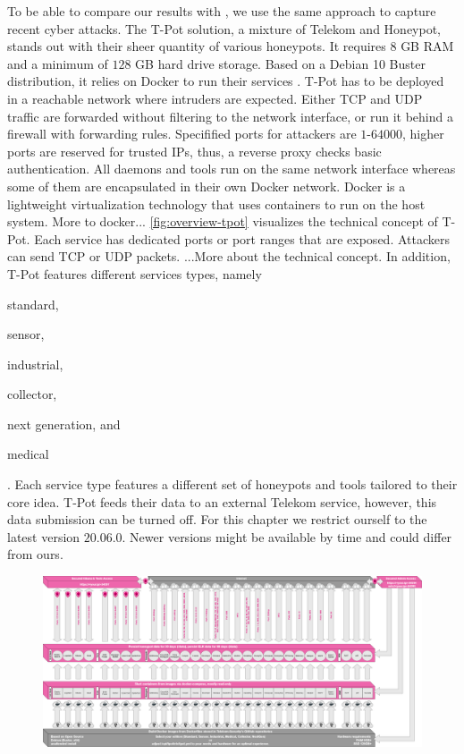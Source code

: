 To be able to compare our results with \citet{Kelly2021}, we use the same approach to capture recent cyber attacks.
The T-Pot solution, a mixture of Telekom and Honeypot, stands out with their sheer quantity of various honeypots.
It requires $8$ GB RAM and a minimum of $128$ GB hard drive storage.
Based on a Debian 10 Buster distribution, it relies on Docker to run their services \cite{combe2016}.
T-Pot has to be deployed in a reachable network where intruders are expected.
Either TCP and UDP traffic are forwarded without filtering to the network interface, or run it behind a firewall with forwarding rules.
Specifified ports for attackers are $1$-$64000$, higher ports are reserved for trusted IPs, thus, a reverse proxy checks basic authentication.
All daemons and tools run on the same network interface whereas some of them are encapsulated in their own Docker network.
Docker is a lightweight virtualization technology that uses containers to run on the host system.
More to docker...
\autoref{fig:overview-tpot} visualizes the technical concept of T-Pot.
Each service has dedicated ports or port ranges that are exposed.
Attackers can send TCP or UDP packets.
...More about the technical concept.
In addition, T-Pot features different services types, namely
\begin{enumerate*}[label=(\roman*)]
    \item standard,
    \item sensor,
    \item industrial,
    \item collector,
    \item next generation, and
    \item medical
\end{enumerate*}.
Each service type features a different set of honeypots and tools tailored to their core idea.
T-Pot feeds their data to an external Telekom service, however, this data submission can be turned off.
For this chapter we restrict ourself to the latest version $20.06.0$.
Newer versions might be available by time and could differ from ours.

\begin{figure}
    \centering
    \includegraphics[width=\textwidth]{figures/architecture.png}
    \caption{}
    \label{fig:overview-tpot}
\end{figure}

